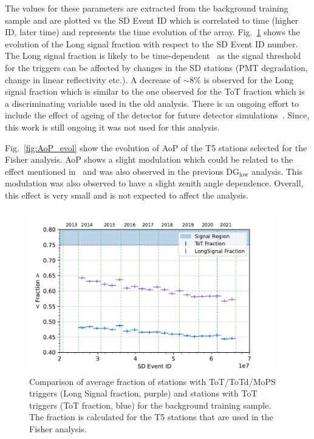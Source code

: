 The values for these parameters are extracted from the background training sample and are plotted vs the SD Event ID which is correlated to time (higher ID, later time) and represents the time evolution of the array. Fig.~\ref{fig:LongSig_evol} shows the evolution of the Long signal fraction with respect to the SD Event ID number. The Long signal fraction is likely to be time-dependent~\cite{Sato:2011zze} as the signal threshold for the triggers can be affected by changes in the SD stations (PMT degradation, change in linear reflectivity etc.). A decrease of $\sim 8\%$ is observed for the Long signal fraction which is similar to the one observed for the ToT fraction which is a discriminating variable used in the old analysis. There is an ongoing effort to include the effect of ageing of the detector for future detector simulations~\cite{PierreAuger:2023xfj}. Since, this work is still ongoing it was not used for this analysis. 

Fig.~\ref{fig:AoP_evol} show the evolution of AoP of the T5 stations selected for the Fisher analysis. AoP shows a slight modulation which could be related to the effect mentioned in~\cite{Sato:2011zze} and was also observed in the previous DG$\mathrm{_{low}}$ analysis. This modulation was also observed to have a slight zenith angle dependence. Overall, this effect is very small and is not expected to affect the analysis.

\begin{figure}[h!]
  \centering
  \includegraphics[width=0.95\textwidth]{thesis_figures/Nu_analysis/Time_evol/Selection_Evo_ToTFrac_LongSignal_wnt_redcut.pdf}
  \caption{Comparison of average fraction of stations with ToT/ToTd/MoPS triggers (Long Signal fraction, purple) and stations with ToT triggers (ToT fraction, blue) for the background training sample. The fraction is calculated for the T5 stations that are used in the Fisher analysis.}
  \label{fig:LongSig_evol}
\end{figure}


